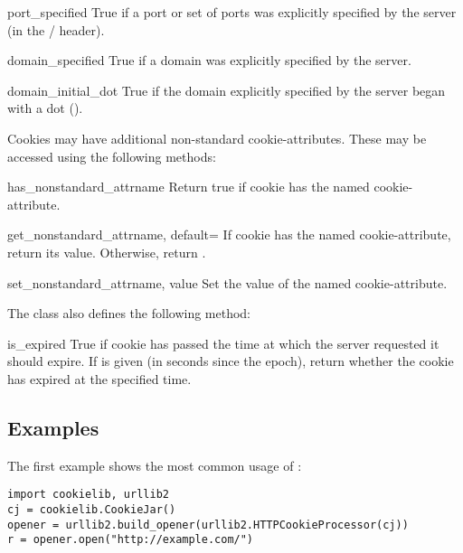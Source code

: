 \begin{memberdesc}[Cookie]{port_specified}
True if a port or set of ports was explicitly specified by the server
(in the  /  header).
\end{memberdesc}
\begin{memberdesc}[Cookie]{domain_specified}
True if a domain was explicitly specified by the server.
\end{memberdesc}
\begin{memberdesc}[Cookie]{domain_initial_dot}
True if the domain explicitly specified by the server began with a
dot ().
\end{memberdesc}

Cookies may have additional non-standard cookie-attributes.  These may
be accessed using the following methods:

\begin{methoddesc}[Cookie]{has_nonstandard_attr}{name}
Return true if cookie has the named cookie-attribute.
\end{methoddesc}
\begin{methoddesc}[Cookie]{get_nonstandard_attr}{name, default=}
If cookie has the named cookie-attribute, return its value.
Otherwise, return .
\end{methoddesc}
\begin{methoddesc}[Cookie]{set_nonstandard_attr}{name, value}
Set the value of the named cookie-attribute.
\end{methoddesc}

The  class also defines the following method:

\begin{methoddesc}[Cookie]{is_expired}{}
True if cookie has passed the time at which the server requested it
should expire.  If  is given (in seconds since the epoch),
return whether the cookie has expired at the specified time.
\end{methoddesc}


\subsection{Examples \label{cookielib-examples}}

The first example shows the most common usage of :

\begin{verbatim}
import cookielib, urllib2
cj = cookielib.CookieJar()
opener = urllib2.build_opener(urllib2.HTTPCookieProcessor(cj))
r = opener.open("http://example.com/")
\end{verbatim}


